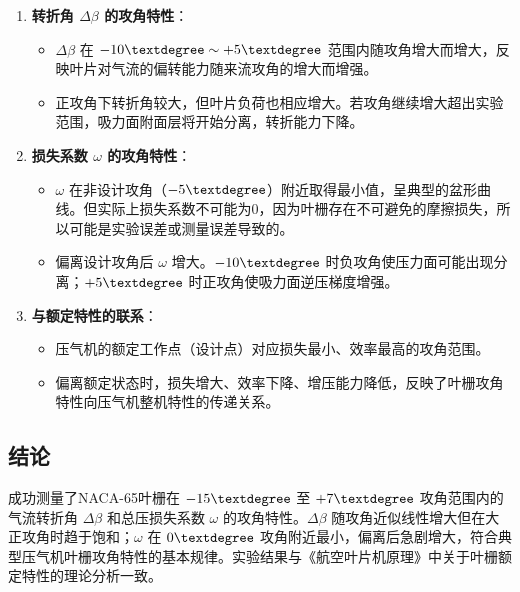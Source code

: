 \begin{enumerate}
    \item \textbf{转折角 $\Delta\beta$ 的攻角特性}：
    \begin{itemize}
        \item $\Delta\beta$ 在 $-10\textdegree \sim +5\textdegree$ 范围内随攻角增大而增大，反映叶片对气流的偏转能力随来流攻角的增大而增强。
        \item 正攻角下转折角较大，但叶片负荷也相应增大。若攻角继续增大超出实验范围，吸力面附面层将开始分离，转折能力下降。
    \end{itemize}
    \item \textbf{损失系数 $\omega$ 的攻角特性}：
    \begin{itemize}
        \item $\omega$ 在非设计攻角（$-5\textdegree$）附近取得最小值，呈典型的盆形曲线。但实际上损失系数不可能为0，因为叶栅存在不可避免的摩擦损失，所以可能是实验误差或测量误差导致的。
        \item 偏离设计攻角后 $\omega$ 增大。$-10\textdegree$ 时负攻角使压力面可能出现分离；$+5\textdegree$ 时正攻角使吸力面逆压梯度增强。
    \end{itemize}
    \item \textbf{与额定特性的联系}：
    \begin{itemize}
        \item 压气机的额定工作点（设计点）对应损失最小、效率最高的攻角范围。
        \item 偏离额定状态时，损失增大、效率下降、增压能力降低，反映了叶栅攻角特性向压气机整机特性的传递关系。
    \end{itemize}
\end{enumerate}

\subsection{结论}

成功测量了NACA-65叶栅在 $-15\textdegree$ 至 $+7\textdegree$ 攻角范围内的气流转折角 $\Delta\beta$ 和总压损失系数 $\omega$ 的攻角特性。$\Delta\beta$ 随攻角近似线性增大但在大正攻角时趋于饱和；$\omega$ 在 $0\textdegree$ 攻角附近最小，偏离后急剧增大，符合典型压气机叶栅攻角特性的基本规律。实验结果与《航空叶片机原理》中关于叶栅额定特性的理论分析一致。
